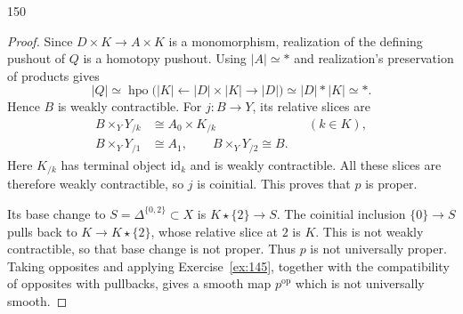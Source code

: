 \begin{exercise}{150}
\begin{proof}
Since $D\times K\to A\times K$ is a monomorphism, realization of
the defining pushout of $Q$ is a homotopy pushout.
Using $|A|\simeq *$ and realization's preservation of products gives
\[
 |Q|\simeq
 \operatorname{hpo}\bigl(|K|\leftarrow|D|\times|K|\to|D|\bigr)
 \simeq |D|*|K|\simeq *.
\]
Hence $B$ is weakly contractible.
For $j\colon B\to Y$, its relative slices are
\[
 \begin{aligned}
 B\times_Y Y_{/k}&\cong A_0\times K_{/k} &&(k\in K),\\
 B\times_Y Y_{/1}&\cong A_1,\qquad
 B\times_Y Y_{/2}\cong B.
 \end{aligned}
\]
Here $K_{/k}$ has terminal object $\mathrm{id}_k$ and is weakly
contractible. All these slices are therefore weakly contractible,
so $j$ is coinitial. This proves that $p$ is proper.

Its base change to $S=\Delta^{\{0,2\}}\subset X$ is
$K\star\{2\}\to S$.
The coinitial inclusion $\{0\}\to S$ pulls back to
$K\to K\star\{2\}$, whose relative slice at $2$ is $K$.
This is not weakly contractible, so that base change is not proper.
Thus $p$ is not universally proper.
Taking opposites and applying Exercise~\ref{ex:145}, together with
the compatibility of opposites with pullbacks, gives a smooth map
$p^{\mathrm{op}}$ which is not universally smooth.
\end{proof}
\end{exercise}
